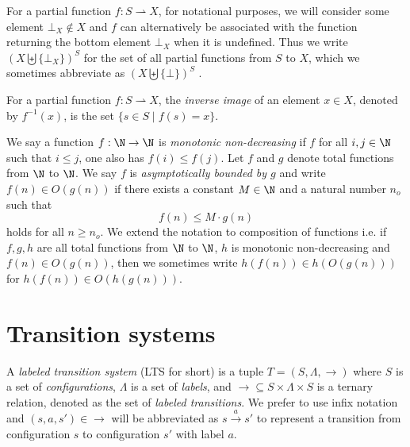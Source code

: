 For a partial function $ f : S \rightharpoonup X $, for notational purposes, we will consider some element $\bot_X \not\in X$ and 
$f$ can alternatively be associated with the function returning the 
bottom element $\bot_X$ when it is undefined. Thus we write $(X \biguplus \{ \bot_X \})^S$ for the set of all partial functions from $S$ to $X$, which we sometimes abbreviate as $(X \biguplus \{ \bot \})^S$%
. 



For a partial function $ f : S \rightharpoonup X $, the {\em inverse image} of an element $x \in X$,
denoted by $f^{-1}(x)$, is the set
$\{ s \in S \mid f(s) = x \}.$

We say a function $f : \N \to \N$ is {\em monotonic non-decreasing} if $f$ for all $i,j \in \N$ 
 such that $i \leq j$, one also has $f(i) \leq f(j)$.
Let $f$ and $g$ denote total functions from $\N$ to $\N$. We say $f$ is 
{\em asymptotically bounded by $g$}
and write $f(n) \in O(g(n))$ if there exists a constant $M \in \N$ and
a natural number $n_o$ such that
$$ f(n) \leq M \cdot g(n)$$
holds for all $n \geq n_o$. We extend the notation to 
composition of functions i.e. if $f, g, h$ are all total functions from $\N$ to $\N$,
 $h$ is monotonic non-decreasing and $f(n) \in O(g(n))$, 
 then we sometimes write $h(f(n)) \in h(O(g(n)))$ for $h(f(n)) \in O(h(g(n)))$.


\section{Transition systems}


A {\em labeled transition system} (LTS for short) is a tuple $T=(S, \Lambda, \rightarrow)$ where 
$S$ is a set of {\em configurations}, $ \Lambda$ is a set of {\em labels}, and 
${\rightarrow} \subseteq S\times \Lambda \times S$ is a 
ternary relation,
denoted as the set of {\em labeled transitions}. 
We
 prefer to use infix notation and $(s,a ,s')\in {\rightarrow} $ will be abbreviated as
       $s  \xrightarrow{a}  s'$
to represent a transition from configuration $s$ to configuration $s'$ with label $a$. \\

